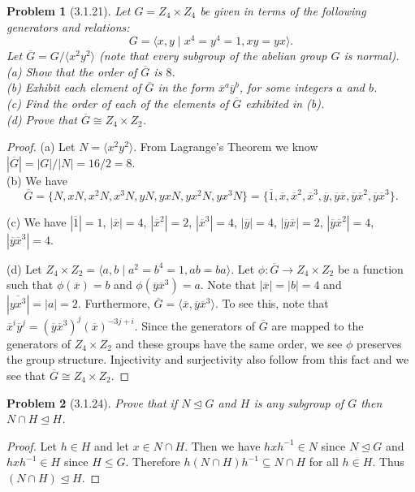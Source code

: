 \documentclass{article}
\newtheorem{problem}{Problem}
\newcommand{\normal}{\unlhd}
\begin{document}
\begin{problem}[3.1.21]
Let $G = Z_4 \times Z_4$ be given in terms of the following generators and relations:
\[
G = \langle x, y \mid x^4 = y^4 = 1, xy = yx \rangle.
\]
Let $\overline{G} = G/\langle x^2y^2 \rangle$ (note that every subgroup of the abelian group $G$ is normal).\\
(a) Show that the order of $\overline{G}$ is $8$.\\
(b) Exhibit each element of $\overline{G}$ in the form $\overline{x}^a\overline{y}^b$, for some integers $a$ and $b$.\\
(c) Find the order of each of the elements of $\overline{G}$ exhibited in (b).\\
(d) Prove that $\overline{G} \cong Z_4 \times Z_2$.
\end{problem}
\begin{proof}
(a) Let $N = \langle x^2y^2 \rangle$. From Lagrange's Theorem we know $|\overline{G}| = |G|/|N| = 16/2 = 8$.\\

(b) We have
\[
\overline{G} = \{N, xN, x^2N, x^3N, yN, yxN, yx^2N, yx^3N\} = \{\overline{1}, \overline{x}, \overline{x}^2, \overline{x}^3, \overline{y}, \overline{y}\overline{x}, \overline{y}\overline{x}^2, \overline{y}\overline{x}^3\}.
\]

(c) We have $|\overline{1}| = 1$, $|\overline{x}| = 4$, $|\overline{x}^2| = 2$, $|\overline{x}^3| = 4$, $|\overline{y}| = 4$, $|\overline{y}\overline{x}| = 2$, $|\overline{y}\overline{x}^2| = 4$, $|\overline{y}\overline{x}^3| = 4$.

(d) Let $Z_4 \times Z_2 = \langle a, b \mid a^2 = b^4 = 1, ab = ba \rangle$. Let $\phi : \overline{G} \rightarrow Z_4 \times Z_2$ be a function such that $\phi(\overline{x}) = b$ and $\phi(\overline{y}\overline{x}^3) = a$. Note that $|\overline{x}| = |b| = 4$ and $|\overline{yx^3}| = |a| = 2$. Furthermore, $\overline{G} = \langle \overline{x}, \overline{y}\overline{x}^3 \rangle$. To see this, note that $\overline{x}^i\overline{y}^j = (\overline{y}\overline{x}^3)^j (\overline{x})^{-3j+i}$. Since the generators of $\overline{G}$ are mapped to the generators of $Z_4 \times Z_2$ and these groups have the same order, we see $\phi$ preserves the group structure. Injectivity and surjectivity also follow from this fact and we see that $\overline{G} \cong Z_4 \times Z_2$.
\end{proof}

\begin{problem}[3.1.24]
Prove that if $N \normal G$ and $H$ is any subgroup of $G$ then $N \cap H \normal H$.
\end{problem}
\begin{proof}
Let $h \in H$ and let $x \in N \cap H$. Then we have $hxh^{-1} \in N$ since $N \normal G$ and $hxh^{-1} \in H$ since $H \leq G$. Therefore $h(N \cap H)h^{-1} \subseteq N \cap H$ for all $h \in H$. Thus $(N \cap H) \normal H$.
\end{proof}
\end{document}
